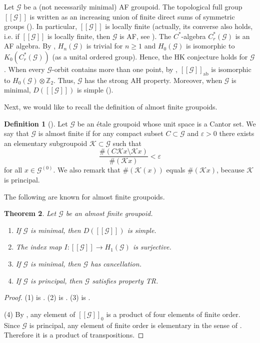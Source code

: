 \documentclass[11pt]{article}
\newtheorem{theorem}{Theorem}[section]
\theoremstyle{definition}
\newtheorem{definition}[theorem]{Definition}
\numberwithin{equation}{section}
\newcommand{\ep}{\varepsilon}
\newcommand{\ab}{\mathrm{ab}}
\newcommand{\K}{\mathcal{K}}
\newcommand{\G}{\mathcal{G}}
\newcommand{\Z}{\mathbb{Z}}
\begin{document}
Let $\G$ be a (not necessarily minimal) AF groupoid. 
The topological full group $[[\G]]$ is written 
as an increasing union of finite direct sums of symmetric groups 
(\cite[Proposition 3.3]{M06IJM}). 
In particular, $[[\G]]$ is locally finite 
(actually, its converse also holds, i.e. 
if $[[\G]]$ is locally finite, then $\G$ is AF, 
see \cite[Proposition 3.2]{M06IJM}). 
The $C^*$-algebra $C^*_r(\G)$ is an AF algebra. 
By \cite[Theorem 4.10, 4.11]{M12PLMS}, 
$H_n(\G)$ is trivial for $n\geq1$ and 
$H_0(\G)$ is isomorphic to $K_0(C^*_r(\G))$ (as a unital ordered group). 
Hence, the HK conjecture holds for $\G$. 
When every $\G$-orbit contains more than one point, 
by \cite[Lemma 3.5]{M06IJM}, 
$[[\G]]_\ab$ is isomorphic to $H_0(\G)\otimes\Z_2$. 
Thus, $\G$ has the strong AH property. 
Moreover, when $\G$ is minimal, $D([[\G]])$ is simple 
(\cite[Lemma 3.5]{M06IJM}). 

Next, we would like to recall the definition of almost finite groupoids. 

\begin{definition}[{\cite[Definition 6.2]{M12PLMS}}]
Let $\G$ be an \'etale groupoid whose unit space is a Cantor set. 
We say that $\G$ is almost finite 
if for any compact subset $C\subset\G$ and $\ep>0$ 
there exists an elementary subgroupoid $\K\subset\G$ such that 
\[
\frac{\#(C\K x\setminus\K x)}{\#(\K x)}<\ep
\]
for all $x\in\G^{(0)}$. 
We also remark that $\#(\K(x))$ equals $\#(\K x)$, because $\K$ is principal. 
\end{definition}

The following are known for almost finite groupoids. 

\begin{theorem}\label{almstfin}
Let $\G$ be an almost finite groupoid. 
\begin{enumerate}
\item If $\G$ is minimal, then $D([[\G]])$ is simple. 
\item The index map $I:[[\G]]\to H_1(\G)$ is surjective. 
\item If $\G$ is minimal, then $\G$ has cancellation. 
\item If $\G$ is principal, then $\G$ satisfies property TR. 
\end{enumerate}
\end{theorem}
\begin{proof}
(1) is \cite[Theorem 4.7]{M15crelle}. 
(2) is \cite[Theorem 7.5]{M12PLMS}. 
(3) is \cite[Theorem 6.12]{M12PLMS}. 

(4)
By \cite[Theorem 7.13]{M12PLMS}, 
any element of $[[\G]]_0$ is a product of four elements of finite order. 
Since $\G$ is principal, any element of finite order is elementary 
in the sense of \cite[Definition 7.6 (1)]{M12PLMS}. 
Therefore it is a product of transpositions. 
\end{proof}
\end{document}
